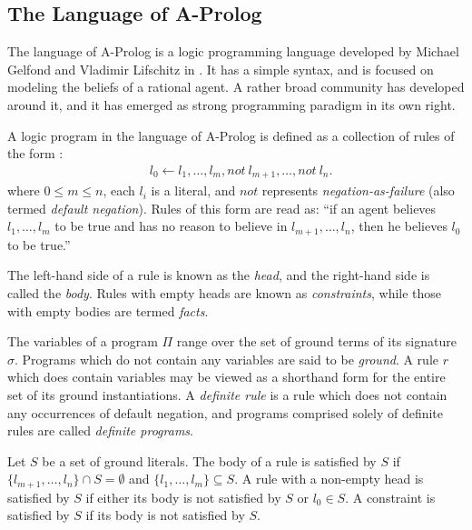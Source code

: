 \documentclass{article}
\newcommand{\intersection}{\ensuremath{\cap}}
\begin{document}
\subsection{The Language of A-Prolog}

The language of A-Prolog is a logic programming language developed by Michael Gelfond and Vladimir Lifschitz in \cite{GL88}. It has a simple syntax, and is focused on modeling the beliefs of a rational agent. A rather broad community has developed around it, and it has emerged as strong programming paradigm in its own right.

A logic program in the language of A-Prolog is defined as a collection of rules of the form \cite{GL88,Baral03}:
\begin{align*}
    &l_{0} \leftarrow l_{1},\ldots,l_{m}, not \: l_{m+1}, \ldots, not \: l_{n}.
\end{align*}
where $0 \leq m \leq n$, each $l_{i}$ is a literal, and $not$ represents \emph{negation-as-failure} (also termed \emph{default negation}). Rules of this form are read as: ``if an agent believes $l_{1},\ldots,l_{m}$ to be true and has no reason to believe in $l_{m+1},\ldots,l_{n}$, then he believes $l_{0}$ to be true.''

The left-hand side of a rule is known as the \emph{head}, and the right-hand side is called the \emph{body}. Rules with empty heads are known as \emph{constraints}, while those with empty bodies are termed \emph{facts}.

The variables of a program $\Pi$ range over the set of ground terms of its signature $\sigma$. Programs which do not contain any variables are said to be \emph{ground}. A rule $r$ which does contain variables may be viewed as a shorthand form for the entire set of its ground instantiations. A \emph{definite rule} is a rule which does not contain any occurrences of default negation, and programs comprised solely of definite rules are called \emph{definite programs}.

Let $S$ be a set of ground literals. The body of a rule is satisfied by $S$ if $\{l_{m+1},\ldots,l_{n}\} \intersection S = \emptyset$ and $\{l_{1},\ldots,l_{m}\} \subseteq S$. A rule with a non-empty head is satisfied by $S$ if either its body is not satisfied by $S$ or $l_{0} \in S$. A constraint is satisfied by $S$ if its body is not satisfied by $S$.
\end{document}
